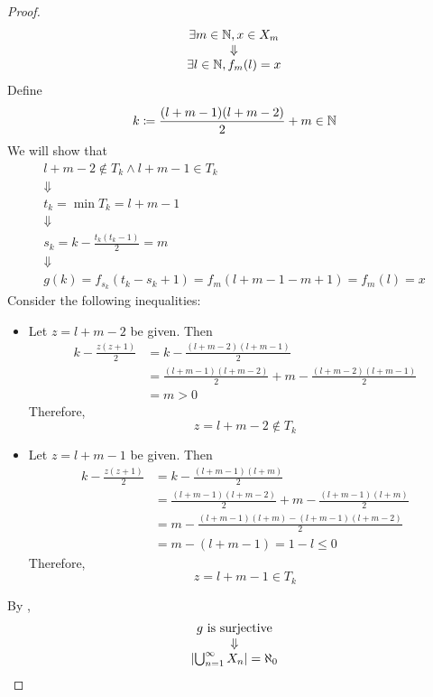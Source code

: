 \begin{proof}
\[    \begin{array}{c}
        \exists m \in \N, x \in X_{m} \\
        \Downarrow \\
        \exists l \in \N, f_{m}(l) = x \\
    \end{array}
    \]
    Define
    \[
    k \coloneqq \frac{(l + m - 1)(l + m - 2)}{2} + m \in \N
    \]
    We will show that
    \[
    \begin{array}{c}
        l + m - 2 \notin T_{k} \land l + m - 1 \in T_{k} \\
        \Downarrow \\
        t_{k} = \min T_{k} = l + m - 1 \\
        \Downarrow \\
        s_{k} = k - \frac{t_{k}(t_{k} - 1)}{2} = m \\
        \Downarrow \\
        g(k) = f_{s_{k}}(t_{k} - s_{k} + 1) = f_{m}(l + m - 1 - m + 1) = f_{m}(l) = x
    \end{array}
    \]
    Consider the following inequalities:
    \begin{itemize}
        \item Let $z = l + m - 2$ be given. Then
        \begin{align*}
            k - \frac{z(z + 1)}{2} &= k - \frac{(l + m - 2)(l + m - 1)}{2} \\
            &= \frac{(l + m - 1)(l + m - 2)}{2} + m - \frac{(l + m - 2)(l + m - 1)}{2} \\
            &= m > 0
        \end{align*}
        Therefore,
        \[
        z = l + m - 2 \notin T_{k}
        \]
        \item Let $z = l + m - 1$ be given. Then
        \begin{align*}
            k - \frac{z(z + 1)}{2} &= k - \frac{(l + m - 1)(l + m)}{2} \\
            &= \frac{(l + m - 1)(l + m - 2)}{2} + m - \frac{(l + m - 1)(l + m)}{2} \\
            &= m - \frac{(l + m - 1)(l + m) - (l + m - 1)(l + m - 2)}{2} \\
            &= m - (l + m - 1) = 1 - l \leq 0
        \end{align*}
        Therefore,
        \[
        z = l + m - 1 \in T_{k}
        \]
    \end{itemize}
    By ,
    \[
    \begin{array}{c}
        g \text{ is surjective} \\
        \Downarrow \\
        \abs*{\bigcup_{n = 1}^{\infty} X_{n}} = \aleph_{0}
    \end{array}
    \]
\end{proof}


